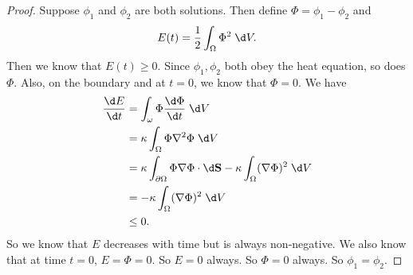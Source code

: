 \documentclass[a4paper]{article}
\begin{document}
\begin{proof}
  Suppose $\phi_1$ and $\phi_2$ are both solutions. Then define $\Phi = \phi_1 - \phi_2$ and
  \[
    E(t) = \frac{1}{2}\int_\Omega \Phi^2 \;\d V.
  \]
  Then we know that $E(t) \geq 0$. Since $\phi_1, \phi_2$ both obey the heat equation, so does $\Phi$. Also, on the boundary and at $t = 0$, we know that $\Phi = 0$. We have
  \begin{align*}
    \frac{\d E}{\d t} &= \int_\omega \Phi \frac{\d \Phi}{\d t}\;\d V\\
    &= \kappa \int_\Omega \Phi \nabla^2 \Phi\;\d V\\
    &= \kappa \int_{\partial \Omega} \Phi \nabla \Phi \cdot \d \mathbf{S} - \kappa \int_\Omega (\nabla \Phi)^2\;\d V\\
    &= - \kappa \int_\Omega (\nabla \Phi)^2\;\d V\\
    &\leq 0.
  \end{align*}
  So we know that $E$ decreases with time but is always non-negative. We also know that at time $t = 0$, $E = \Phi = 0$. So $E = 0$ always. So $\Phi = 0$ always. So $\phi_1 = \phi_2$.
\end{proof}
\end{document}
